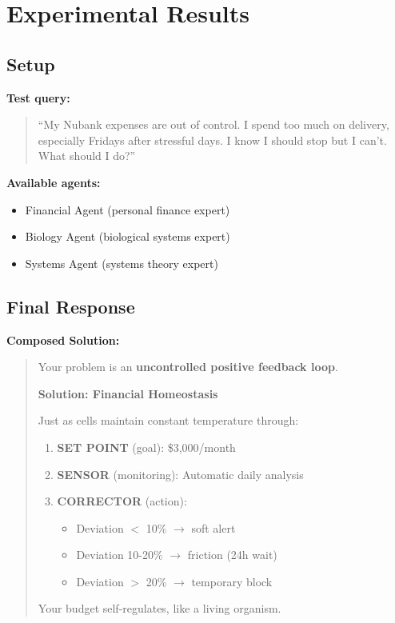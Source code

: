 \documentclass[11pt]{article}
\begin{document}
\section{Experimental Results}

\subsection{Setup}

\textbf{Test query:}

\begin{quote}
``My Nubank expenses are out of control. I spend too much on delivery, especially Fridays after stressful days. I know I should stop but I can't. What should I do?''
\end{quote}

\textbf{Available agents:}
\begin{itemize}
    \item Financial Agent (personal finance expert)
    \item Biology Agent (biological systems expert)
    \item Systems Agent (systems theory expert)
\end{itemize}

\subsection{Final Response}

\textbf{Composed Solution:}

\begin{quote}
Your problem is an \textbf{uncontrolled positive feedback loop}.

\textbf{Solution: Financial Homeostasis}

Just as cells maintain constant temperature through:

\begin{enumerate}
    \item \textbf{SET POINT} (goal): \$3,000/month
    \item \textbf{SENSOR} (monitoring): Automatic daily analysis
    \item \textbf{CORRECTOR} (action):
    \begin{itemize}
        \item Deviation $<$ 10\% $\rightarrow$ soft alert
        \item Deviation 10-20\% $\rightarrow$ friction (24h wait)
        \item Deviation $>$ 20\% $\rightarrow$ temporary block
    \end{itemize}
\end{enumerate}

Your budget self-regulates, like a living organism.
\end{quote}
\end{document}
